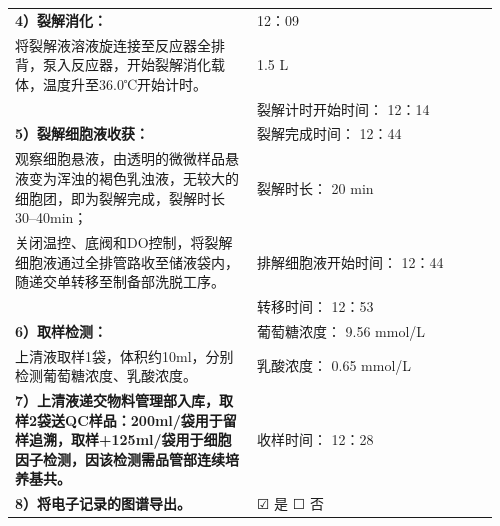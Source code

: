 \documentclass[UTF8,10pt,a4paper,fontset=fandol]{ctexart}
\newcommand{\fieldvalue}[1]{#1}
\newcommand{\handwritten}[1]{#1}
\newcommand{\checkboxfield}[1]{\ifstrequal{#1}{checked}{☑}{\ifstrequal{#1}{unclear}{?}{☐}}}
\begin{document}
\begin{tabular}{|p{0.48\linewidth}|p{0.48\linewidth}|}
\hline
\textbf{4）裂解消化：} &
\fieldvalue{\handwritten{12：09}} \\
将裂解液溶液旋连接至反应器全排背，泵入反应器，开始裂解消化载体，温度升至36.0℃开始计时。 &
\fieldvalue{\handwritten{1.5 L}} \\
&
裂解计时开始时间：
\fieldvalue{\handwritten{12：14}} \\
\hline
\textbf{5）裂解细胞液收获：} &
裂解完成时间：
\fieldvalue{\handwritten{12：44}} \\
观察细胞悬液，由透明的微微样品悬液变为浑浊的褐色乳浊液，无较大的细胞团，即为裂解完成，裂解时长30--40min； &
裂解时长：
\fieldvalue{\handwritten{20}} min \\
关闭温控、底阀和DO控制，将裂解细胞液通过全排管路收至储液袋内，随递交单转移至制备部洗脱工序。 &
排解细胞液开始时间：
\fieldvalue{\handwritten{12：44}} \\[0.3em]
&
转移时间：
\fieldvalue{\handwritten{12：53}} \\
\hline
\textbf{6）取样检测：} &
葡萄糖浓度：
\fieldvalue{\handwritten{9.56}} mmol/L \\
上清液取样1袋，体积约10ml，分别检测葡萄糖浓度、乳酸浓度。 &
乳酸浓度：
\fieldvalue{\handwritten{0.65}} mmol/L \\
\hline
\textbf{7）上清液递交物料管理部入库，取样2袋送QC样品：200ml/袋用于留样追溯，取样+125ml/袋用于细胞因子检测，因该检测需品管部连续培养基共。} &
收样时间：
\fieldvalue{\handwritten{12：28}} \\
\hline
\textbf{8）将电子记录的图谱导出。} &
\fieldvalue{\checkboxfield{checked}} 是
\qquad
\fieldvalue{\checkboxfield{unchecked}} 否 \\
\hline
\end{tabular}
\end{document}
